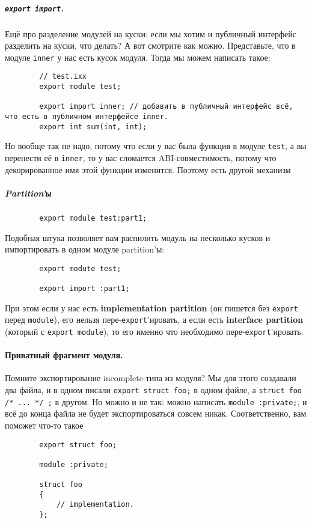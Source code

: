 \documentclass{article}
\begin{document}
    \subparagraph{\texttt{export import}.}
    Ещё про разделение модулей на куски: если мы хотим и публичный интерфейс разделить на куски, что делать? А вот смотрите как можно. Представьте, что в модуле \texttt{inner} у нас есть кусок модуля. Тогда мы можем написать такое:
    \begin{verbatim}
        // test.ixx
        export module test;

        export import inner; // добавить в публичный интерфейс всё, что есть в публичном интерфейсе inner.
        export int sum(int, int);
    \end{verbatim}
    Но вообще так не надо, потому что если у вас была функция в модуле \texttt{test}, а вы перенести её в \texttt{inner}, то у вас сломается ABI-совместимость, потому что декорированное имя этой функции изменится. Поэтому есть другой механизм
    \subparagraph{Partition'ы}
    \begin{verbatim}
        export module test:part1;
    \end{verbatim}
    Подобная штука позволяет вам распилить модуль на несколько кусков и импортировать в одном модуле partition'ы:
    \begin{verbatim}
        export modute test;

        export import :part1;
    \end{verbatim}
    При этом если у нас есть \textbf{implementation partition} (он пишется без \texttt{export} перед \texttt{module}), его нельзя пере-\texttt{export}'ировать, а если есть \textbf{interface partition} (который с \texttt{export module}), то его именно что необходимо пере-\texttt{export}'ировать.
    \paragraph{Приватный фрагмент модуля.}
    Помните экспортирование incomplete-типа из модуля? Мы для этого создавали два файла, и в одном писали \texttt{export struct foo;} в одном файле, а \texttt{struct foo { /* ... */ };} в другом. Но можно и не так: можно написать \texttt{module :private;}, и всё до конца файла не будет экспортироваться совсем никак. Соответственно, вам поможет что-то такое
    \begin{verbatim}
        export struct foo;

        module :private;

        struct foo
        {
            // implementation.
        };
    \end{verbatim}
\end{document}
